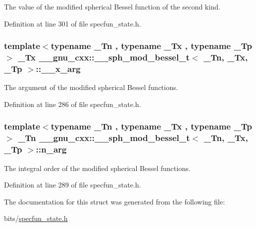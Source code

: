 The value of the modified spherical Bessel function of the second kind. 



Definition at line 301 of file specfun\+\_\+state.\+h.

\subsubsection[{\texorpdfstring{\+\_\+\+\_\+x\+\_\+arg}{__x_arg}}]{\setlength{\rightskip}{0pt plus 5cm}template$<$typename \+\_\+\+Tn , typename \+\_\+\+Tx , typename \+\_\+\+Tp $>$ \+\_\+\+Tx {\bf \+\_\+\+\_\+gnu\+\_\+cxx\+::\+\_\+\+\_\+sph\+\_\+mod\+\_\+bessel\+\_\+t}$<$ \+\_\+\+Tn, \+\_\+\+Tx, \+\_\+\+Tp $>$\+::\+\_\+\+\_\+x\+\_\+arg}\hypertarget{struct____gnu__cxx_1_1____sph__mod__bessel__t_ae4a4e05aa107855789a3b5859f9476e9}{}\label{struct____gnu__cxx_1_1____sph__mod__bessel__t_ae4a4e05aa107855789a3b5859f9476e9}


The argument of the modified spherical Bessel functions. 



Definition at line 286 of file specfun\+\_\+state.\+h.

\subsubsection[{\texorpdfstring{n\+\_\+arg}{n_arg}}]{\setlength{\rightskip}{0pt plus 5cm}template$<$typename \+\_\+\+Tn , typename \+\_\+\+Tx , typename \+\_\+\+Tp $>$ \+\_\+\+Tn {\bf \+\_\+\+\_\+gnu\+\_\+cxx\+::\+\_\+\+\_\+sph\+\_\+mod\+\_\+bessel\+\_\+t}$<$ \+\_\+\+Tn, \+\_\+\+Tx, \+\_\+\+Tp $>$\+::n\+\_\+arg}\hypertarget{struct____gnu__cxx_1_1____sph__mod__bessel__t_afbd56c00f493b7bb6e3fbee5bcd1558d}{}\label{struct____gnu__cxx_1_1____sph__mod__bessel__t_afbd56c00f493b7bb6e3fbee5bcd1558d}


The integral order of the modified spherical Bessel functions. 



Definition at line 289 of file specfun\+\_\+state.\+h.



The documentation for this struct was generated from the following file\+:\begin{DoxyCompactItemize}
\item 
bits/\hyperlink{specfun__state_8h}{specfun\+\_\+state.\+h}\end{DoxyCompactItemize}
